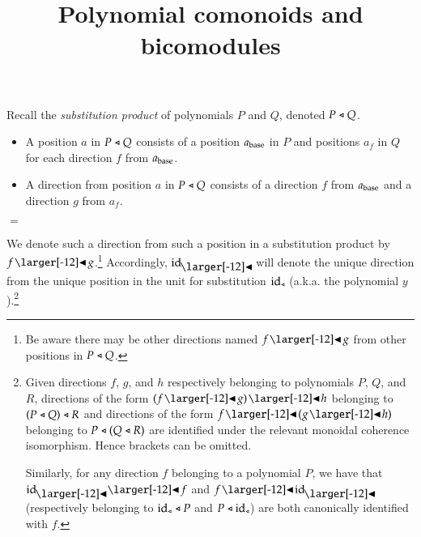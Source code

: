 \documentclass{amsart}
\title{Polynomial comonoids and bicomodules}
\begin{document}
\maketitle

\vspace{1.5em}

\iffalse
  A \emph{polynomial}\footnote{The name refers to a correspondence
    between families of sets and sums of powers, illustrated by the
    example
    ${2y^4 + y^2 + y \leftrightarrow
      \{\{\ast,\ast,\ast,\ast\},\{\ast,\ast,\ast,\ast\},\{\ast,\ast\},
      \{\ast\}\}}$.} is an indexed family of sets.

  The indexes of sets are called \emph{positions}, and the members of
  indexed sets are called \emph{directions}.

  We will visualize a polynomial as a collection of corollas.


  A corolla is a node with arrows pointing out from it; this denotes a
  position and the directions from it.
\fi

Recall the \emph{substitution product} of polynomials $P$ and $Q$, denoted
$P \sub Q$.

\iffalse
  From polynomials $P$ and $Q$, we can form a new polynomial
  of all the possible two-story trees built by stacking $Q$
  corollas atop a $P$ corolla. This is called the \emph{substitution
    product}, denoted $P \sub Q$.
\fi

\begin{itemize}
\item A position $a$ in $P \sub Q$ consists of a position $a_{\mathrm{base}}$ in
  $P$ and positions $a_f$ in $Q$ for each direction $f$ from
  $a_{\mathrm{base}}$.
\item A direction from position $a$ in $P \sub Q$ consists of a
  direction $f$ from $a_{\mathrm{base}}$ and a direction $g$ from $a_f$.
\end{itemize}
\vspace{.5em}
\begin{center}
  
  \qquad
  {\Large$=$}
  \quad
  
\end{center}
\vspace{1em}

We denote such a direction from such a position in a substitution
product by $f \subd g$.\footnote{Be aware there may be other
  directions named $f \subd g$ from other positions in
  $P \sub Q$.} Accordingly, $\idsubd$ will denote the unique direction
from the unique position in the unit for substitution $\mathrm{id}_{\mathrel{\triangleleft}}$
(a.k.a. the polynomial $y$).\footnote{Given directions $f$,
    $g$, and $h$ respectively belonging to polynomials $P$, $Q$, and
    $R$, directions of the form $(f \subd g)\subd h$ belonging to
    $(P \mathrel{\triangleleft} Q) \mathrel{\triangleleft} R$ and directions of the form
    $f \subd (g \subd h)$ belonging to $P \mathrel{\triangleleft} (Q \mathrel{\triangleleft} R)$ are
    identified under the relevant monoidal coherence
    isomorphism. Hence brackets can be omitted.

  Similarly, for any direction $f$ belonging to a polynomial $P$, we
  have that $\idsubd \subd f$ and $f \subd \idsubd$ (respectively
  belonging to $\mathrm{id}_{\mathrel{\triangleleft}} \mathrel{\triangleleft} P$ and $P \mathrel{\triangleleft} \mathrm{id}_{\mathrel{\triangleleft}}$) are both
  canonically identified with $f$.}
\end{document}

